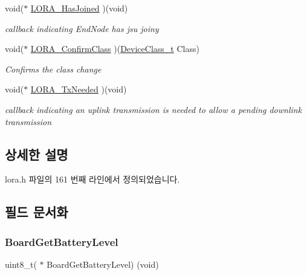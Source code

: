 \begin{DoxyCompactItemize}
void($\ast$ \mbox{\hyperlink{structs_lo_ra_main_callback_a956862bc1dcb958fc8b232f61535c5aa}{L\+O\+R\+A\+\_\+\+Has\+Joined}} )(void)
\begin{DoxyCompactList}\small\item\em callback indicating End\+Node has jsu joiny \end{DoxyCompactList}\item 
void($\ast$ \mbox{\hyperlink{structs_lo_ra_main_callback_abfbc0131a4d9b3702c8fb93228f342a8}{L\+O\+R\+A\+\_\+\+Confirm\+Class}} )(\mbox{\hyperlink{group___l_o_r_a_m_a_c_ga29dc2e097802faaf8fbd0e18ff99695f}{Device\+Class\+\_\+t}} Class)
\begin{DoxyCompactList}\small\item\em Confirms the class change \end{DoxyCompactList}\item 
void($\ast$ \mbox{\hyperlink{structs_lo_ra_main_callback_a1155e4044eaa6ca31a53fc0d14d9414b}{L\+O\+R\+A\+\_\+\+Tx\+Needed}} )(void)
\begin{DoxyCompactList}\small\item\em callback indicating an uplink transmission is needed to allow a pending downlink transmission \end{DoxyCompactList}\end{DoxyCompactItemize}


\subsection{상세한 설명}


lora.\+h 파일의 161 번째 라인에서 정의되었습니다.



\subsection{필드 문서화}
\mbox{\label{structs_lo_ra_main_callback_ac4412349f783b6e7653afd9e3725f436}} 
\subsubsection{\texorpdfstring{Board\+Get\+Battery\+Level}{BoardGetBatteryLevel}}
{\footnotesize\ttfamily uint8\+\_\+t( $\ast$ Board\+Get\+Battery\+Level) (void)}



